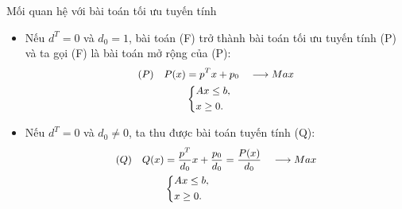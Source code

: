 \documentclass{beamer}
\begin{document}
\begin{frame}{Mối quan hệ với bài toán tối ưu tuyến tính}
\begin{itemize}
\item Nếu $d^T=0$ và $d_0=1$, bài toán (F) trở thành bài toán tối ưu tuyến tính (P) và ta gọi (F) là bài toán mở rộng của (P):
\begin{equation} \small \label{P}
    \begin{split}
    (P) \quad P(x) & = p^Tx+p_0 \quad \longrightarrow Max \\
        & \left\{
        \begin{split}
        &Ax \leq  b, \\
        &x \geq 0. \\
        \end{split}
        \right.    
    \end{split}
\end{equation}
\item Nếu $d^T=0$ và $d_0 \neq 0$, ta thu được bài toán tuyến tính (Q):
\begin{equation} \small \label{Q}
    \begin{split}
    (Q) \quad Q(x) & = \frac{p^T}{d_0}x+\frac{p_0}{d_0}=\frac{P(x)}{d_0} \quad \longrightarrow Max \\
        & \left\{
        \begin{split}
        &Ax \leq  b, \\
        &x \geq 0. \\
        \end{split}
        \right.    
    \end{split}
\end{equation}
\end{itemize}
\end{frame}
\end{document}
